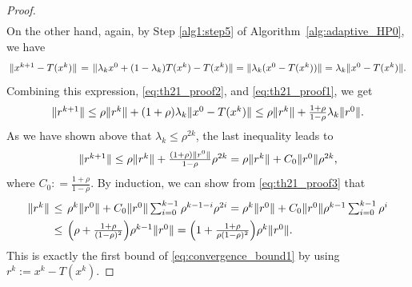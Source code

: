 \documentclass{article}
\theoremstyle{plain}
\theoremstyle{definition}
\newcommand{\norms}[1]{\Vert#1\Vert}
\newcommand{\0}{\boldsymbol{0}}
\begin{document}
\begin{proof}
\begin{equation}
\begin{array}{lcl}
\end{array}
\end{equation}
On the other hand, again, by Step \ref{alg1:step5} of Algorithm~\ref{alg:adaptive_HP0}, we have 
\begin{equation*} 
\arraycolsep=0.2em
\begin{array}{lcl}
\norms{x^{k+1} - T(x^k)} &= & \norms{ \lambda_kx^0 + (1-\lambda_k)T(x^k) - T(x^k)} = \norms{\lambda_k(x^0 - T(x^k))} = \lambda_k\norms{x^0 - T(x^k)}.
\end{array}
\end{equation*}
Combining this expression, \eqref{eq:th21_proof2}, and \eqref{eq:th21_proof1}, we get 
\begin{equation*} 
\arraycolsep=0.2em
\begin{array}{lcl}
\norms{r^{k+1}} \leq \rho\norms{r^k} + (1+\rho)\lambda_k\norms{x^0 - T(x^k)} \leq \rho\norms{r^k} + \frac{1+\rho}{1-\rho}\lambda_k\norms{r^0}.
\end{array}
\end{equation*}
As we have shown above that $\lambda_k \leq \rho^{2k}$, the last inequality leads to
\begin{equation}\label{eq:th21_proof3} 
\arraycolsep=0.2em
\begin{array}{lcl}
\norms{r^{k+1}} \leq \rho\norms{r^k} + \frac{(1+\rho)\norms{r^0}}{1-\rho}   \rho^{2k} = \rho \norms{r^k} + C_0\norms{r^0} \rho^{2k},
\end{array}
\end{equation}
where $C_0 : = \frac{1+\rho}{1-\rho}$.
By induction, we can show from \eqref{eq:th21_proof3} that
\begin{equation*} 
\arraycolsep=0.2em
\begin{array}{lcl}
\norms{r^k} & \leq & \rho^k\norms{r^0} + C_0\norms{r^0} \sum_{i=0}^{k-1}\rho^{k-1-i}\rho^{2i} = \rho^k\norms{r^0} + C_0\norms{r^0} \rho^{k-1}\sum_{i=0}^{k-1}\rho^i \vspace{1ex}\\
& \leq & \Big( \rho + \frac{1+\rho}{(1-\rho)^2}\Big)\rho^{k-1} \norms{r^0} = \Big(1 + \frac{1+\rho}{\rho(1-\rho)^2}\Big)\rho^{k} \norms{r^0}.
\end{array}
\end{equation*}
This is exactly the first bound of \eqref{eq:convergence_bound1} by using $r^k := x^k - T(x^k)$.


\end{proof}
\end{document}
